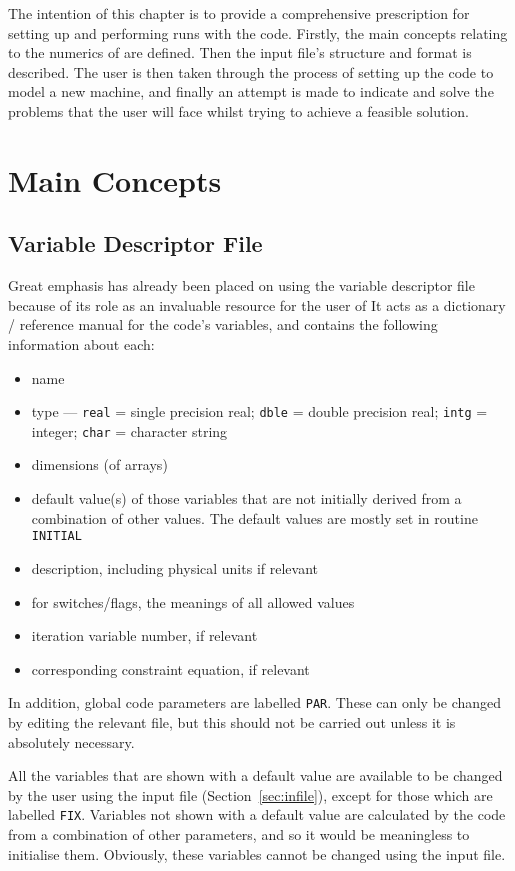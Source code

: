 \label{chap:run}

The intention of this chapter is to provide a comprehensive prescription for
setting up and performing runs with the code.  Firstly, the main concepts
relating to the numerics of \PS are defined. Then the input file's structure
and format is described. The user is then taken through the process of setting
up the code to model a new machine, and finally an attempt is made to indicate
and solve the problems that the user will face whilst trying to achieve a
feasible solution.

\section{Main Concepts}

\subsection{Variable Descriptor File}

Great emphasis has already been placed on using the variable descriptor file
because of its role as an invaluable resource for the user of \PSD It acts as
a dictionary / reference manual for the code's variables, and contains the
following information about each:
\begin{itemize}
\item name
\item
type --- {\tt real} = single precision real; {\tt dble} = double precision
real; {\tt intg} = integer; {\tt char} = character string
\item
dimensions (of arrays)
\item
default value(s) of those variables that are not initially derived from a
combination of other values. The default values are mostly set in routine {\tt
INITIAL}
\item
description, including physical units if relevant
\item
for switches/flags, the meanings of all allowed values
\item
iteration variable number, if relevant
\item
corresponding constraint equation, if relevant
\end{itemize}
In addition, global code parameters are labelled {\tt PAR}. These can only be
changed by editing the relevant \INCLUDE file, but this should not be carried
out unless it is absolutely necessary.

All the variables that are shown with a default value are available to be
changed by the user using the input file (Section~\ref{sec:infile}), except
for those which are labelled {\tt FIX}. Variables not shown with a default
value are calculated by the code from a combination of other parameters, and
so it would be meaningless to initialise them.  Obviously, these variables
cannot be changed using the input file.


